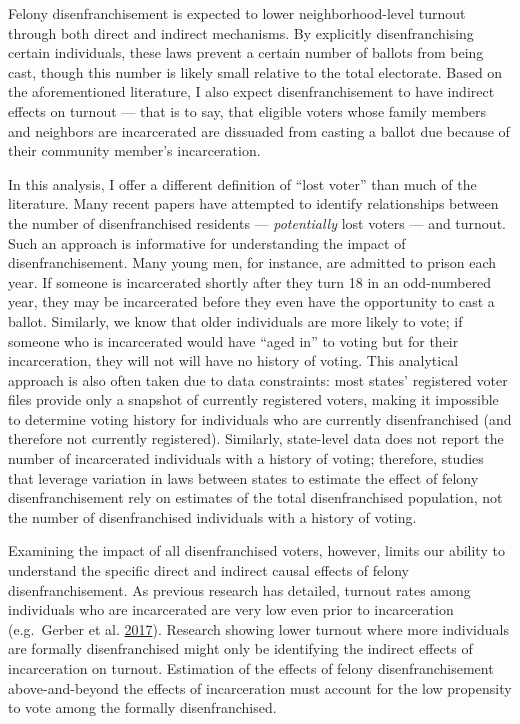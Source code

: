 \documentclass[12pt,]{article}
\begin{document}
Felony disenfranchisement is expected to lower neighborhood-level turnout through both direct and indirect mechanisms. By explicitly disenfranchising certain individuals, these laws prevent a certain number of ballots from being cast, though this number is likely small relative to the total electorate. Based on the aforementioned literature, I also expect disenfranchisement to have indirect effects on turnout --- that is to say, that eligible voters whose family members and neighbors are incarcerated are dissuaded from casting a ballot due because of their community member's incarceration.

In this analysis, I offer a different definition of ``lost voter'' than much of the literature. Many recent papers have attempted to identify relationships between the number of disenfranchised residents --- \emph{potentially} lost voters --- and turnout. Such an approach is informative for understanding the impact of disenfranchisement. Many young men, for instance, are admitted to prison each year. If someone is incarcerated shortly after they turn 18 in an odd-numbered year, they may be incarcerated before they even have the opportunity to cast a ballot. Similarly, we know that older individuals are more likely to vote; if someone who is incarcerated would have ``aged in'' to voting but for their incarceration, they will not will have no history of voting. This analytical approach is also often taken due to data constraints: most states' registered voter files provide only a snapshot of currently registered voters, making it impossible to determine voting history for individuals who are currently disenfranchised (and therefore not currently registered). Similarly, state-level data does not report the number of incarcerated individuals with a history of voting; therefore, studies that leverage variation in laws between states to estimate the effect of felony disenfranchisement rely on estimates of the total disenfranchised population, not the number of disenfranchised individuals with a history of voting.

Examining the impact of all disenfranchised voters, however, limits our ability to understand the specific direct and indirect causal effects of felony disenfranchisement. As previous research has detailed, turnout rates among individuals who are incarcerated are very low even prior to incarceration (e.g.~Gerber et al. \protect\hyperlink{ref-Gerber2017}{2017}). Research showing lower turnout where more individuals are formally disenfranchised might only be identifying the indirect effects of incarceration on turnout. Estimation of the effects of felony disenfranchisement above-and-beyond the effects of incarceration must account for the low propensity to vote among the formally disenfranchised.
\end{document}
